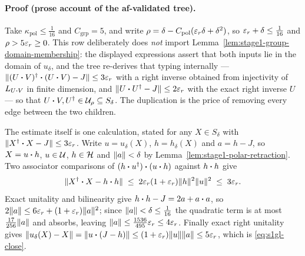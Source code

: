 \paragraph{Proof (prose account of the af-validated tree).}
Take $\kappa_{\mathrm{pol}}\le\tfrac1{16}$ and $C_{\mathrm{grp}}=5$, and write
$\rho=\delta-C_{\mathrm{pol}}(\varepsilon_r\delta+\delta^{2})$, so $\varepsilon_r+\delta\le\tfrac1{16}$ and
$\rho>5\varepsilon_r\ge0$. This row deliberately does \emph{not} import
Lemma~\ref{lem:stage1-group-domain-membership}: the displayed expressions assert that both
inputs lie in the domain of $u_\delta$, and the tree re-derives that typing internally ---
$\lVert (U\mathbin{\bm{\cdot}} V)^{\dagger}\mathbin{\bm{\cdot}}(U\mathbin{\bm{\cdot}} V)-J\rVert\le3\varepsilon_r$ with a right inverse obtained from
injectivity of $L_{U\mathbin{\bm{\cdot}} V}$ in finite dimension, and
$\lVert U\mathbin{\bm{\cdot}} U^{\dagger}-J\rVert\le2\varepsilon_r$ with the exact right inverse $U$ --- so that
$U\mathbin{\bm{\cdot}} V,U^{\dagger}\in\mathcal U_{\rho}\subseteq S_\delta$. The duplication is the price of removing
every edge between the two children.

The estimate itself is one calculation, stated for any $X\in S_\delta$ with
$\lVert X^{\dagger}\mathbin{\bm{\cdot}} X-J\rVert\le3\varepsilon_r$. Write $u=u_\delta(X)$, $h=h_\delta(X)$ and $a=h-J$, so
$X=u\mathbin{\bm{\cdot}} h$, $u\in\mathcal U$, $h\in\mathcal H$ and $\lVert a\rVert<\delta$ by
Lemma~\ref{lem:stage1-polar-retraction}. Two associator comparisons of
$(h\mathbin{\bm{\cdot}} u^{\dagger})\mathbin{\bm{\cdot}}(u\mathbin{\bm{\cdot}} h)$ against $h\mathbin{\bm{\cdot}} h$ give
\begin{equation}\label{eq:s1gl-square}
  \lVert X^{\dagger}\mathbin{\bm{\cdot}} X-h\mathbin{\bm{\cdot}} h\rVert\;\le\;2\varepsilon_r(1+\varepsilon_r)\lVert h\rVert^{2}\lVert u\rVert^{2}\;\le\;3\varepsilon_r .
\end{equation}
Exact unitality and bilinearity give $h\mathbin{\bm{\cdot}} h-J=2a+a\mathbin{\bm{\cdot}} a$, so
$2\lVert a\rVert\le6\varepsilon_r+(1+\varepsilon_r)\lVert a\rVert^{2}$; since $\lVert a\rVert<\delta\le\tfrac1{16}$ the
quadratic term is at most $\tfrac{17}{256}\lVert a\rVert$ and absorbs, leaving
$\lVert a\rVert\le\tfrac{1536}{495}\varepsilon_r\le4\varepsilon_r$. Finally exact right unitality gives
$\lVert u_\delta(X)-X\rVert=\lVert u\mathbin{\bm{\cdot}}(J-h)\rVert\le(1+\varepsilon_r)\lVert u\rVert\lVert a\rVert\le5\varepsilon_r$, which is
\eqref{eq:s1gl-close}.

